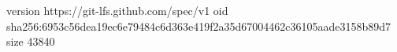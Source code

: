version https://git-lfs.github.com/spec/v1
oid sha256:6953c56dea19ec6e79484c6d363e419f2a35d67004462c36105aade3158b89d7
size 43840
